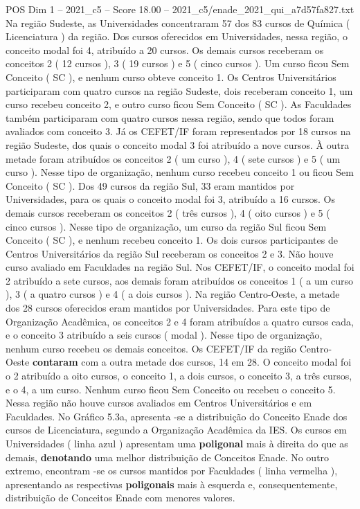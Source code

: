 \begin{textsample}{POS Dim 1 – 2021\_c5 – Score 18.00 – 2021\_c5/enade\_2021\_qui\_a7d57fa827.txt}
Na região Sudeste, as Universidades concentraram 57 dos 83 cursos de Química ( Licenciatura ) da região.
Dos cursos oferecidos em Universidades, nessa região, o conceito modal foi 4, atribuído a 20 cursos.
Os demais cursos receberam os conceitos 2 ( 12 cursos ), 3 ( 19 cursos ) e 5 ( cinco cursos ).
Um curso ficou Sem Conceito ( SC ), e nenhum curso obteve conceito 1.
Os Centros Universitários participaram com quatro cursos na região Sudeste, dois receberam conceito 1, um curso recebeu conceito 2, e outro curso ficou Sem Conceito ( SC ).
As Faculdades também participaram com quatro cursos nessa região, sendo que todos foram avaliados com conceito 3.
Já os CEFET/IF foram representados por 18 cursos na região Sudeste, dos quais o conceito modal 3 foi atribuído a nove cursos.
À outra metade foram atribuídos os conceitos 2 ( um curso ), 4 ( sete cursos ) e 5 ( um curso ).
Nesse tipo de organização, nenhum curso recebeu conceito 1 ou ficou Sem Conceito ( SC ).
Dos 49 cursos da região Sul, 33 eram mantidos por Universidades, para os quais o conceito modal foi 3, atribuído a 16 cursos.
Os demais cursos receberam os conceitos 2 ( três cursos ), 4 ( oito cursos ) e 5 ( cinco cursos ).
Nesse tipo de organização, um curso da região Sul ficou Sem Conceito ( SC ), e nenhum recebeu conceito 1.
Os dois cursos participantes de Centros Universitários da região Sul receberam os conceitos 2 e 3.
Não houve curso avaliado em Faculdades na região Sul.
Nos CEFET/IF, o conceito modal foi 2 atribuído a sete cursos, aos demais foram atribuídos os conceitos 1 ( a um curso ), 3 ( a quatro cursos ) e 4 ( a dois cursos ).
Na região Centro-Oeste, a metade dos 28 cursos oferecidos eram mantidos por Universidades.
Para este tipo de Organização Acadêmica, os conceitos 2 e 4 foram atribuídos a quatro cursos cada, e o conceito 3 atribuído a seis cursos ( modal ).
Nesse tipo de organização, nenhum curso recebeu os demais conceitos.
Os CEFET/IF da região Centro-Oeste \textbf{contaram} com a outra metade dos cursos, 14 em 28.
O conceito modal foi o 2 atribuído a oito cursos, o conceito 1, a dois cursos, o conceito 3, a três cursos, e o 4, a um curso.
Nenhum curso ficou Sem Conceito ou recebeu o conceito 5.
Nessa região não houve cursos avaliados em Centros Universitários e em Faculdades.
No Gráfico 5.3a, apresenta -se a distribuição do Conceito Enade dos cursos de Licenciatura, segundo a Organização Acadêmica da IES.
Os cursos em Universidades ( linha azul ) apresentam uma \textbf{poligonal} mais à direita do que as demais, \textbf{denotando} uma melhor distribuição de Conceitos Enade.
No outro extremo, encontram -se os cursos mantidos por Faculdades ( linha vermelha ), apresentando as respectivas \textbf{poligonais} mais à esquerda e, consequentemente, distribuição de Conceitos Enade com menores valores.

\end{textsample}
